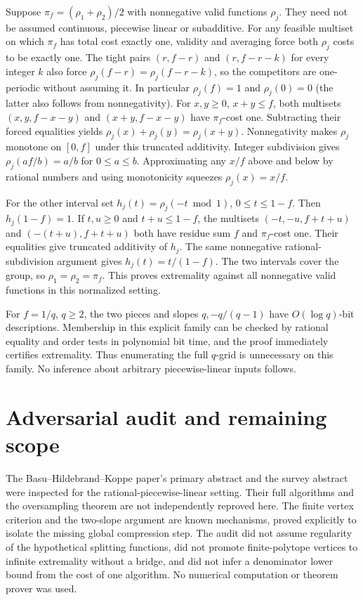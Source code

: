 \documentclass[11pt]{article}
\begin{document}
Suppose $\pi_f=(\rho_1+\rho_2)/2$ with nonnegative valid functions $\rho_j$.
They need not be assumed continuous, piecewise linear or subadditive.
For any feasible multiset on which $\pi_f$ has total cost exactly one,
validity and averaging force both $\rho_j$ costs to be exactly one.
The tight pairs $(r,f-r)$ and $(r,f-r-k)$ for every integer $k$ also
force $\rho_j(f-r)=\rho_j(f-r-k)$, so the competitors are one-periodic
without assuming it. In particular $\rho_j(f)=1$ and $\rho_j(0)=0$
(the latter also follows from nonnegativity). For $x,y\ge0$, $x+y\le f$, both multisets
$(x,y,f-x-y)$ and $(x+y,f-x-y)$ have $\pi_f$-cost one.
Subtracting their forced equalities yields
$\rho_j(x)+\rho_j(y)=\rho_j(x+y)$.
Nonnegativity makes $\rho_j$ monotone on $[0,f]$ under this truncated
additivity. Integer subdivision gives $\rho_j(af/b)=a/b$ for
$0\le a\le b$. Approximating any $x/f$ above and below by rational numbers
and using monotonicity squeezes $\rho_j(x)=x/f$.

For the other interval set $h_j(t)=\rho_j(-t\bmod1)$,
$0\le t\le1-f$. Then $h_j(1-f)=1$. If $t,u\ge0$ and $t+u\le1-f$,
the multisets $(-t,-u,f+t+u)$ and $(-(t+u),f+t+u)$ both have residue
sum $f$ and $\pi_f$-cost one. Their equalities give truncated additivity
of $h_j$. The same nonnegative rational-subdivision argument gives
$h_j(t)=t/(1-f)$. The two intervals cover the group, so
$\rho_1=\rho_2=\pi_f$. This proves extremality against all nonnegative
valid functions in this normalized setting.

For $f=1/q$, $q\ge2$, the two pieces and slopes $q,-q/(q-1)$ have
$O(\log q)$-bit descriptions. Membership in this explicit family can be
checked by rational equality and order tests in polynomial bit time, and
the proof immediately certifies extremality. Thus enumerating the full
$q$-grid is unnecessary on this family. No inference about arbitrary
piecewise-linear inputs follows.

\section{Adversarial audit and remaining scope}
The Basu--Hildebrand--Koppe paper's primary abstract and the survey abstract
were inspected for the rational-piecewise-linear setting. Their full algorithms
and the oversampling theorem are not independently reproved here.
The finite vertex criterion and the two-slope argument are known mechanisms,
proved explicitly to isolate the missing global compression step. The audit
did not assume regularity of the hypothetical splitting functions, did not
promote finite-polytope vertices to infinite extremality without a bridge,
and did not infer a denominator lower bound from the cost of one algorithm.
No numerical computation or theorem prover was used.
\end{document}
